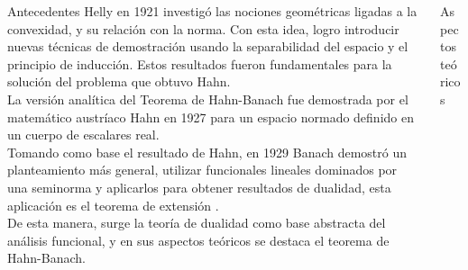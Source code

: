 \documentclass[24pt,final]{beamer}
\newlength{\onecolwid}
\newlength{\twocolwid}
\begin{document}
\begin{frame}[t]
\begin{columns}[t]
\begin{column}{\twocolwid}
\begin{columns}[t,totalwidth=\twocolwid]
\begin{column}{\onecolwid}

\begin{block}{Antecedentes}
Helly en 1921 investigó las nociones geométricas ligadas a la convexidad, y su relación con la norma. Con esta idea, logro introducir nuevas técnicas de demostración usando la separabilidad del espacio y el principio de inducción. Estos resultados fueron fundamentales para la solución del problema que obtuvo Hahn.\\[0.7cm]

La versión analítica del Teorema de Hahn-Banach fue demostrada por el matemático austríaco Hahn en 1927 para un espacio normado definido en un cuerpo de escalares real.\\[0.7cm]

Tomando como base el resultado de Hahn,  en 1929 Banach demostró un planteamiento más general,  utilizar funcionales lineales dominados por una seminorma y aplicarlos para obtener resultados de dualidad, esta aplicación es el teorema de extensión \cite{Bombal:2003jr}.\\[0.7cm]

De esta manera, surge la teoría de dualidad como base abstracta del análisis funcional, y en sus aspectos teóricos se destaca el teorema de Hahn-Banach.


\end{block}


\end{column} %

\begin{column}{\onecolwid}\vspace{-.6in} %

\begin{block}{Aspectos teóricos}
 

\end{block}
\end{column}
\end{columns}
\end{column}
\end{columns}
\end{frame}
\end{document}
